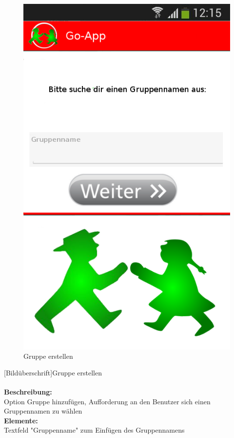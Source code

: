 \begin{figure}[H]
	\caption{Gruppe erstellen}
\begin{center}
	\includegraphics[scale =0.5]{resources/images/gruppe_erstellen.png}
\end{center}
\end{figure}
[Bildüberschrift]Gruppe erstellen\\ \\
\textbf{Beschreibung:}\\
Option Gruppe hinzufügen, Aufforderung an den Benutzer sich einen Gruppennamen zu wählen\\
\textbf{Elemente:}\\
Textfeld "Gruppenname" zum Einfügen des Gruppennamens\\
